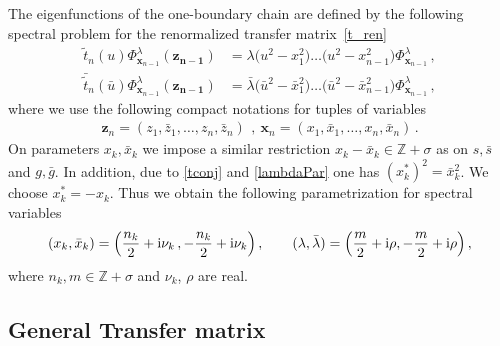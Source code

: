 \documentclass[a4paper,11pt]{article}
\renewcommand{\imath}{\mathrm{i}}
\numberwithin{equation}{section}
\begin{document}
The eigenfunctions of the one-boundary chain are defined by the following spectral problem for the renormalized transfer matrix~\eqref{t_ren}
\begin{equation} \label{eigenvalue}
\begin{aligned}
\tilde{t}_n(u)\Phi_{\bm{x}_{n-1}}^{\lambda}(\bm{z_{n-1}}) 
&= \lambda \bigl(u^2-x_1^2\bigr) \ldots \bigl(u^2-x_{n-1}^2\bigr) \Phi_{\bm{x}_{n-1}}^{\lambda} \,, \\
\bar{\tilde{t}}_n(\bar{u})\Phi_{\bm{x}_{n-1}}^{\lambda}(\bm{z_{n-1}}) 
&= \bar{\lambda} \bigl(\bar{u}^2-\bar{x}_1^2\bigr) \ldots \bigl(\bar{u}^2-\bar{x}_{n-1}^2\bigr) \Phi_{\bm{x}_{n-1}}^{\lambda} \,,
\end{aligned}
\end{equation}
where we use the following compact notations for tuples of variables
\begin{align}\nonumber
	\bm z_n=(z_1,\bar{z}_1, \ldots, z_n, \bar{z}_n) \ \,, \  
	\bm x_n=(x_1,\bar{x}_1, \ldots, x_n, \bar{x}_n)  \,.
\end{align}
On parameters $x_k,\bar{x}_k$ we impose a similar restriction $x_k-\bar{x}_k\in\mathbb{Z}+\sigma$ as on $s,\bar{s}$ and $g,\bar{g}$. In addition, due to \eqref{tconj} and \eqref{lambdaPar} one has $(x_k^\ast)^2=\bar{x}_k^2$. We choose $x_k^\ast=-x_k$.
Thus we obtain the following parametrization for spectral variables
\begin{equation} \nonumber
	(x_k, \bar{x}_k) = \Bigl(\frac{n_k}{2}+\imath\nu_k \,, -\frac{n_k}{2}+\imath\nu_k\Bigr)\,, \qquad
	(\lambda,\bar{\lambda}) = \Bigl(\frac{m}{2}+\imath\rho, -\frac{m}{2}+\imath\rho\Bigr) \,,
\end{equation}
where $n_k, m\in\mathbb{Z}+\sigma$ and $\nu_k$, $\rho$ are real.


\subsection{General Transfer matrix}
\label{sect:generalT}
\end{document}
